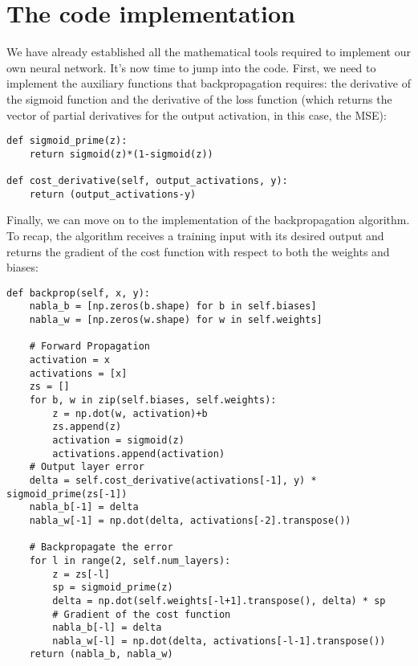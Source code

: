 \documentclass[../main]{subfiles}
\begin{document}
\section{The code implementation}
We have already established all the mathematical tools required to implement our own neural network. It's now time to jump into the code. First, we need to implement the auxiliary functions that backpropagation requires: the derivative of the sigmoid function and the derivative of the loss function (which returns the vector of partial derivatives for the output activation, in this case, the MSE):
\begin{lstlisting}
def sigmoid_prime(z):
    return sigmoid(z)*(1-sigmoid(z))

def cost_derivative(self, output_activations, y):
    return (output_activations-y) 
\end{lstlisting}
Finally, we can move on to the implementation of the backpropagation algorithm. To recap, the algorithm receives a training input with its desired output and returns the gradient of the cost function with respect to both the weights and biases:
\begin{lstlisting}
def backprop(self, x, y):
    nabla_b = [np.zeros(b.shape) for b in self.biases]
    nabla_w = [np.zeros(w.shape) for w in self.weights]
        
    # Forward Propagation
    activation = x
    activations = [x] 
    zs = [] 
    for b, w in zip(self.biases, self.weights):
        z = np.dot(w, activation)+b
        zs.append(z)
        activation = sigmoid(z)
        activations.append(activation)
    # Output layer error
    delta = self.cost_derivative(activations[-1], y) * sigmoid_prime(zs[-1])
    nabla_b[-1] = delta
    nabla_w[-1] = np.dot(delta, activations[-2].transpose())

    # Backpropagate the error
    for l in range(2, self.num_layers):
        z = zs[-l]
        sp = sigmoid_prime(z)
        delta = np.dot(self.weights[-l+1].transpose(), delta) * sp
        # Gradient of the cost function
        nabla_b[-l] = delta
        nabla_w[-l] = np.dot(delta, activations[-l-1].transpose())
    return (nabla_b, nabla_w)
\end{lstlisting}
\end{document}
